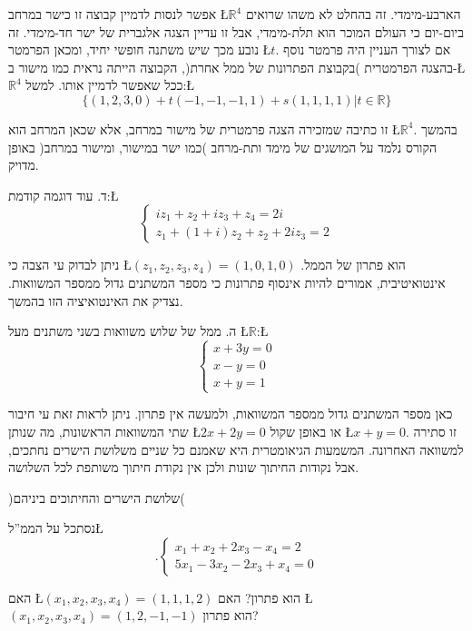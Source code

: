 \begin{examples}
אפשר לנסות לדמיין קבוצה זו כישר במרחב \L{$\mathbb{\mathbb{R}}^{4}$}
הארבע-מימדי. זה בהחלט לא משהו שרואים ביום-יום כי העולם המוכר הוא תלת-מימדי,
אבל זו עדיין הצגה אלגברית של ישר חד-מימדי. זה נובע מכך שיש משתנה חופשי
יחיד, ומכאן הפרמטר \L{$t$}. אם לצורך העניין היה פרמטר נוסף בהצגה
הפרמטרית )בקבוצת הפתרונות של ממ\textquotedbl ל אחרת(, הקבוצה הייתה
\textquotedbl נראית\textquotedbl{} כמו מישור ב-\L{$\mathbb{\mathbb{R}}^{4}$}
ככל שאפשר לדמיין אותו. למשל:\L{%
\[
\{(1,2,3,0)+t(-1,-1,-1,1)+s(1,1,1,1)|t\in\mathbb{R}\}
\]
}%

זו כתיבה שמזכירה הצגה פרמטרית של מישור במרחב, אלא שכאן המרחב הוא \L{$\mathbb{R}^{4}$}.
בהמשך הקורס נלמד על המושגים של מימד ותת-מרחב )כמו ישר במישור, ומישור
במרחב( באופן מדויק.

ד. עוד דוגמה קודמת:\L{%
\[
\begin{cases}
iz_{1}+z_{2}+iz_{3}+z_{4}=2i\\
z_{1}+(1+i)z_{2}+z_{2}+2iz_{3}=2
\end{cases}
\]
}%

ניתן לבדוק ע\textquotedbl י הצבה כי \L{$(z_{1},z_{2},z_{3},z_{4})=(1,0,1,0)$}
הוא פתרון של הממ\textquotedbl ל. אינטואיטיבית, אמורים להיות אינסוף
פתרונות כי מספר המשתנים גדול ממספר המשוואות. נצדיק את האינטואיציה
הזו בהמשך.

ה. ממ\textquotedbl ל של שלוש משוואות בשני משתנים מעל \L{$\mathbb{\mathbb{R}}$}:\L{%
\[
\begin{cases}
x+3y=0\\
x-y=0\\
x+y=1
\end{cases}
\]
}%

כאן מספר המשתנים גדול ממספר המשוואות, ולמעשה אין פתרון. ניתן לראות
זאת ע\textquotedbl י חיבור שתי המשוואות הראשונות, מה שנותן \L{$2x+2y=0$}
או באופן שקול \L{$x+y=0$}. זו סתירה למשוואה האחרונה. המשמעות הגיאומטרית
היא שאמנם כל שניים משלושת הישרים נחתכים, אבל נקודות החיתוך שונות ולכן
אין נקודת חיתוך משותפת לכל השלושה.
\begin{center}
)שלושת הישרים והחיתוכים ביניהם(
\par\end{center}
\end{examples}

\begin{self}
נסתכל על הממ\textquotedblright ל\L{%
\[
.\begin{cases}
x_{1}+x_{2}+2x_{3}-x_{4}=2\\
5x_{1}-3x_{2}-2x_{3}+x_{4}=0
\end{cases}
\]
}%

האם \L{$(x_{1},x_{2},x_{3},x_{4})=(1,1,1,2)$} הוא פתרון? האם \L{$(x_{1},x_{2},x_{3},x_{4})=(1,2,-1,-1)$}
הוא פתרון?
\end{self}

